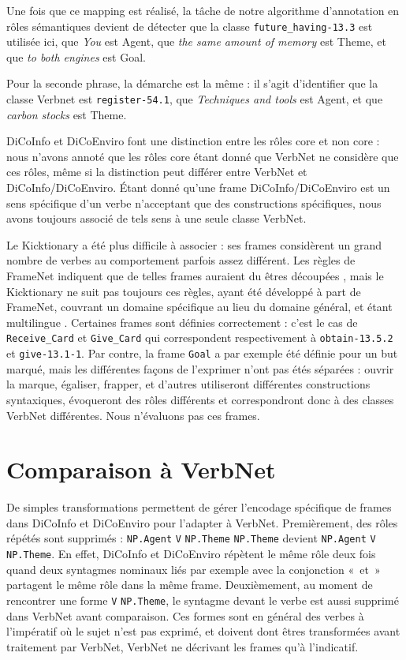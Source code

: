Une fois que ce mapping est réalisé, la tâche de notre algorithme d'annotation
en rôles sémantiques devient de détecter que la classe \texttt{future\_having-13.3} est
utilisée ici, que \textit{You} est Agent, que \textit{the same amount of memory} est Theme,
et que \textit{to both engines} est Goal.

Pour la seconde phrase, la démarche est la même : il s'agit d'identifier que la
classe Verbnet est \texttt{register-54.1}, que \textit{Techniques and tools}
est Agent, et que \textit{carbon stocks} est Theme.

DiCoInfo et DiCoEnviro font une distinction entre les rôles core et non core :
nous n'avons annoté que les rôles core étant donné que VerbNet ne considère que
ces rôles, même si la distinction peut différer entre VerbNet et
DiCoInfo/DiCoEnviro. Étant donné qu'une frame DiCoInfo/DiCoEnviro est un sens
spécifique d'un verbe n'acceptant que des constructions spécifiques, nous avons
toujours associé de tels sens à une seule classe VerbNet.

Le Kicktionary a été plus difficile à associer : ses frames considèrent un
grand nombre de verbes au comportement parfois assez différent. Les règles de
FrameNet indiquent que de telles frames auraient du êtres découpées
\citep{ruppenhofer2006extended}, mais le Kicktionary ne suit pas toujours ces
règles, ayant été développé à part de FrameNet, couvrant un domaine spécifique
au lieu du domaine général, et étant multilingue
\citep{schmidt2006interfacing}. Certaines frames sont définies correctement :
c'est le cas de \texttt{Receive\_Card} et \texttt{Give\_Card} qui correspondent
respectivement à \texttt{obtain-13.5.2} et \texttt{give-13.1-1}. Par contre, la
frame \texttt{Goal} a par exemple été définie pour un but marqué, mais les
différentes façons de l'exprimer n'ont pas étés séparées : ouvrir la marque,
égaliser, frapper, et d'autres utiliseront différentes constructions
syntaxiques, évoqueront des rôles différents et correspondront donc à des
classes VerbNet différentes. Nous n'évaluons pas ces frames.

\section{Comparaison à VerbNet}
\label{comparaison_verbnet}

De simples transformations permettent de gérer l'encodage spécifique de frames
dans DiCoInfo et DiCoEnviro pour l'adapter à VerbNet. Premièrement, des rôles
répétés sont supprimés : \texttt{NP.Agent} \texttt{V} \texttt{NP.Theme}
\texttt{NP.Theme} devient \texttt{NP.Agent} \texttt{V} \texttt{NP.Theme}. En
effet, DiCoInfo et DiCoEnviro répètent le même rôle deux fois quand deux
syntagmes nominaux liés par exemple avec la conjonction «~et~» partagent le
même rôle dans la même frame. Deuxièmement, au moment de rencontrer une forme
\texttt{V} \texttt{NP.Theme}, le syntagme devant le verbe est aussi supprimé
dans VerbNet avant comparaison. Ces formes sont en général des verbes à
l'impératif où le sujet n'est pas exprimé, et doivent dont êtres transformées
avant traitement par VerbNet, VerbNet ne décrivant les frames qu'à l'indicatif.

